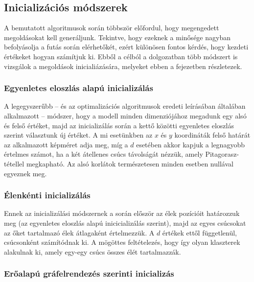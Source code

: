 
\subsection{Inicializációs módszerek} \label{initializationMethods}

A bemutatott algoritmusok során többször előfordul, hogy megengedett megoldásokat kell generáljunk. Tekintve, hogy ezeknek a minősége nagyban befolyásolja a futás során elérhetőkét, ezért különösen fontos kérdés, hogy kezdeti értékeket hogyan számítjuk ki. Ebből a célból a dolgozatban több módszert is vizsgálok a megoldások inicialiázására, melyeket ebben a fejezetben részletezek.

\subsubsection{Egyenletes eloszlás alapú inicializálás}

A legegyszerűbb -- és az optimalizációs algoritmusok eredeti leírásában általában alkalmazott -- módszer, hogy a modell minden dimenziójához megadunk egy alsó és felső értéket, majd az inicializálás során a kettő közötti egyenletes eloszlás szerint választunk új értéket. A mi esetünkben az $x$ és $y$ koordináták felső határát az alkalmazott képméret adja meg, míg a $d$ esetében akkor kapjuk a legnagyobb értelmes számot, ha a két átellenes csúcs távolságát nézzük, amely Pitagorasz-tétellel megkapható. Az alsó korlátok természetesen minden esetben nullával egyeznek meg.

\subsubsection{Élenkénti inicializálás}

Ennek az inicializálási módszernek a során először az élek pozícióit határozzuk meg (az egyenletes eloszlás alapú inicicializálás szerint), majd az egyes csúcsokat az őket tartalmazó élek átlagaként értelmezzük. A $d$ értékek ettől függetlenül, csúcsonként számítódnak ki. A mögöttes feltételezés, hogy így olyan klaszterek alakulnak ki, amely egy-egy csúcs összes élét tartalmazzák.


\subsubsection{Erőalapú gráfelrendezés szerinti inicializás}

